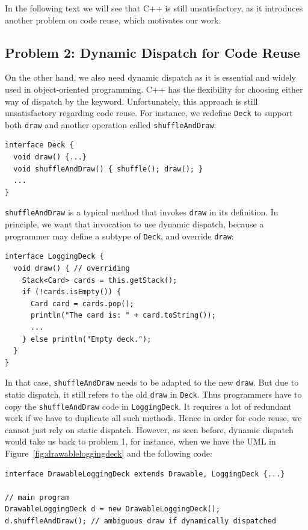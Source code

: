 In the following text we will see that C++ is still unsatisfactory, as it introduces another problem on code reuse, which motivates
our work.

\subsection{Problem 2: Dynamic Dispatch for Code Reuse}\label{subsec:problem2}

On the other hand, we also need dynamic dispatch as it is essential and widely used in object-oriented programming.
C++ has the flexibility for choosing either way of dispatch by the \kwvirtual{} keyword.
Unfortunately, this approach is still unsatisfactory regarding code reuse. For instance, 
we redefine \lstinline|Deck| to support
both \lstinline|draw| and another operation called \lstinline|shuffleAndDraw|:
\vspace{3pt}\begin{lstlisting}
interface Deck {
  void draw() {...}
  void shuffleAndDraw() { shuffle(); draw(); }
  ...
}
\end{lstlisting}\vspace{3pt}
\lstinline|shuffleAndDraw| is a typical method that invokes \lstinline|draw| in its definition. In principle, we want
that invocation to use dynamic dispatch, because a programmer may define a subtype of \lstinline|Deck|, and override \lstinline|draw|:
\vspace{3pt}\begin{lstlisting}
interface LoggingDeck {
  void draw() { // overriding
    Stack<Card> cards = this.getStack();
    if (!cards.isEmpty()) {
      Card card = cards.pop();
      println("The card is: " + card.toString());
      ...
    } else println("Empty deck.");
  }
}
\end{lstlisting}\vspace{3pt}
In that case, \lstinline|shuffleAndDraw| needs to be adapted to the new \lstinline|draw|. But due to static dispatch,
it still refers to the old \lstinline|draw| in \lstinline|Deck|. Thus programmers have to copy the \lstinline|shuffleAndDraw| code in
\lstinline|LoggingDeck|. It requires a lot of redundant work if we have to duplicate all such methods. Hence in order for code reuse,
we cannot just rely on static dispatch. However, as seen before, dynamic dispatch would take us back to problem 1, for instance, when we
have the UML in Figure~\ref{fig:drawableloggingdeck} and the following code:
\vspace{3pt}\begin{lstlisting}
interface DrawableLoggingDeck extends Drawable, LoggingDeck {...}

// main program
DrawableLoggingDeck d = new DrawableLoggingDeck();
d.shuffleAndDraw(); // ambiguous draw if dynamically dispatched
\end{lstlisting}\vspace{3pt}

